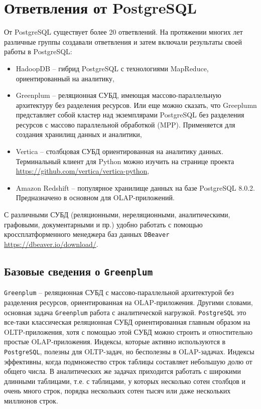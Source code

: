 \documentclass[%
	11pt,
	a4paper,
	utf8,
		]{article}
\begin{document}
\section{Ответвления от PostgreSQL}

От PostgreSQL существует более 20 ответвлений. На протяжении многих лет различные группы создавали ответвления и затем включали результаты своей работы в PostgreSQL:
\begin{itemize}
	\item HadoopDB -- гибрид PostgreSQL с технологиями MapReduce, ориентированный на аналитику,
	
	\item Greenplum -- реляционная СУБД, имеющая массово-параллельную архитектуру без разделения ресурсов. Или еще можно сказать, что Greeplumn представляет собой кластер над экземплярами PostgreSQL без разделения ресурсов с массово параллельной обработкой (MPP). Применяется для создания хранилищ данных и аналитики,
	
	\item Vertica -- столбцовая СУБД ориентированная на аналитику данных. Терминальный клиент для Python можно изучить на странице проекта \url{https://github.com/vertica/vertica-python},
	
	\item Amazon Redshift -- популярное хранилище данных на базе PostgreSQL 8.0.2. Предназначено в основном для OLAP-приложений. 
\end{itemize}

С различными СУБД (реляционными, нереляционными, аналитическими, графовыми, документарными и пр.) удобно работать с помощью кроссплатформенного менеджера баз данных \texttt{DBeaver} \url{https://dbeaver.io/download/}.

\subsection{Базовые сведения о \texttt{Greenplum}}

\texttt{Greenplum} -- реляционная СУБД с массово-параллельной архитектурой без разделения ресурсов, ориентированная на OLAP-приложения. Другими словами, основная задача \texttt{Greenplum} работа с аналитической нагрузкой. \texttt{PostgreSQL} это все-таки классическая реляционная СУБД ориентированная главным образом на OLTP-приложения, хотя с помощью этой СУБД можно строить и отностительно простые OLAP-приложения. Индексы, которые активно используются в \texttt{PostgreSQL}, полезны для OLTP-задач, но бесполезны в OLAP-задачах. Индексы эффективны, когда подмножество строк таблицы составляет небольшую долю от общего числа. В аналитических же задачах приходится работать с широкими длинными таблицами, т.е. с таблицами, у которых несколько сотен столбцов и очень много строк, порядка нескольких сотен тысяч или даже нескольких миллионов строк.
\end{document}
